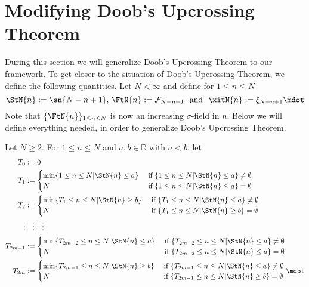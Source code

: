 \section{Modifying Doob's Upcrossing Theorem}
During this section we will generalize Doob's Upcrossing Theorem to our framework. To get closer to the situation of Doob's Upcrossing Theorem, we define the following quantities. Let $N<\infty$ and define for $1\leq n\leq N$ 
\begin{equation*}
\StN{n} := \sn{N-n+1} \textrm{, } \FtN{n} := \F_{N-n+1} \textrm{ \ and \ } \xitN{n} := \xi_{N-n+1}\mdot
\end{equation*}
Note that $\{\FtN{n}\}_{1\leq n\leq N}$ is now an increasing $\sigma$-field in $n$.
%
Below we will define everything needed, in order to generalize Doob's Upcrossing Theorem.
\begin{defn}
	Let $N\geq 2$. For $1\leq n\leq N$ and $a, b \in \mathbb{R}$ with $a < b$, let 
	\begin{align*}
	T_0 &:= 0\\
	T_1 &:= \begin{cases} 
	\min\{1\leq n\leq N | \StN{n}\leq a\} & \textrm{ if } \{1\leq n\leq N | \StN{n}\leq a\}\neq \emptyset\\
	N & \textrm{ if } \{1\leq n\leq N | \StN{n}\leq a\}= \emptyset
	\end{cases}\\	
	T_2 &:= \begin{cases} 
	\min\{T_1\leq n\leq N | \StN{n}\geq b\} & \textrm{ if } \{T_1\leq n\leq N | \StN{n}\leq a\}\neq \emptyset\\
	N & \textrm{ if } \{T_1\leq n\leq N | \StN{n}\geq b\} = \emptyset
	\end{cases}\\	
	\vdots &\quad \vdots \quad \vdots	\\
	T_{2m-1} &:= \begin{cases} 
	\min\{T_{2m-2}\leq n\leq N | \StN{n}\leq a\} & \textrm{ if } \{T_{2m-2}\leq n\leq N | \StN{n}\leq a\}\neq \emptyset\\
	N & \textrm{ if } \{T_{2m-2}\leq n\leq N | \StN{n}\leq a\}= \emptyset
	\end{cases}\\	
	T_{2m} &:= \begin{cases} 
	\min\{T_{2m-1}\leq n\leq N | \StN{n}\geq b\} & \textrm{ if } \{T_{2m-1}\leq n\leq N | \StN{n}\leq a\}\neq \emptyset\\
	N & \textrm{ if } \{T_{2m-1}\leq n\leq N | \StN{n}\geq b\} = \emptyset
	\end{cases}\mdot

\end{align*}
\end{defn}
